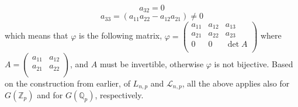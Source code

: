 \documentclass[12pt]{article}
\begin{document}
$$a_{32}=0$$
$$a_{33}=(a_{11}a_{22}-a_{12}a_{21})\neq 0
$$
which means that $\varphi$ is the following matrix, $\varphi=\begin{pmatrix}
a_{11} & a_{12} & a_{13}\\
a_{21} & a_{22} & a_{23}\\
0 & 0 & \det A\\
\end{pmatrix}
$
where $A=\begin{pmatrix}
a_{11} & a_{12}\\
a_{21} & a_{22}\\
\end{pmatrix}
$, and $A$ must be invertible, otherwise $\varphi$ is not bijective. Based on the construction from earlier, of $L_{n,p}$ and $\mathcal{L}_{n,p}$, all the above applies also for $G(\mathbb{Z}_p)$ and for $G(\mathbb{Q}_p)$, respectively.
\end{document}
